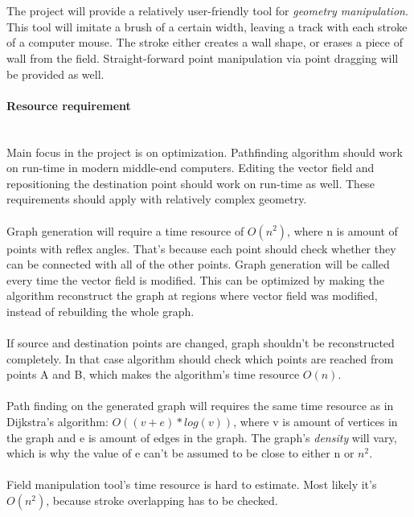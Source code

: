 \documentclass[a4paper,12pt]{article}
\begin{document}
\\
\\
\indent The project will provide a relatively user-friendly tool for \emph{geometry manipulation}. This tool will imitate a brush of a certain width, leaving a track with each stroke of a computer mouse. The stroke either creates a wall shape, or erases a piece of wall from the field. Straight-forward point manipulation via point dragging will be provided as well.
\paragraph{Resource requirement} \hspace{0pt} \\
\indent Main focus in the project is on optimization. Pathfinding algorithm should work on run-time in modern middle-end computers. Editing the vector field and repositioning the destination point
should work on run-time as well. These requirements should apply with relatively complex geometry.
\\
\\
\indent Graph generation will require a time resource of $O(n^2)$, where n is amount of points with reflex angles. That's because each point should check whether they can be connected with all of the other points. Graph generation will be called every time the vector field is modified. This can be optimized by making the algorithm reconstruct the graph at regions where vector field was modified, instead of rebuilding the whole graph.
\\
\\
\indent If source and destination points are changed, graph shouldn't be reconstructed completely. In that case algorithm should check which points are reached from points A and B, which makes the algorithm's time resource $O(n)$.
\\
\\
\indent Path finding on the generated graph will requires the same time resource as in Dijkstra's algorithm: $O((v+e)*log(v))$, where v is amount of vertices in the graph and e is amount of edges in the graph. The graph's \emph{density} will vary, which is why the value of e can't be assumed to be close to either n or $n^2$.
\\
\\
\indent Field manipulation tool's time resource is hard to estimate. Most likely it's $O(n^2)$, because stroke overlapping has to be checked.
\\
\\
\end{document}
